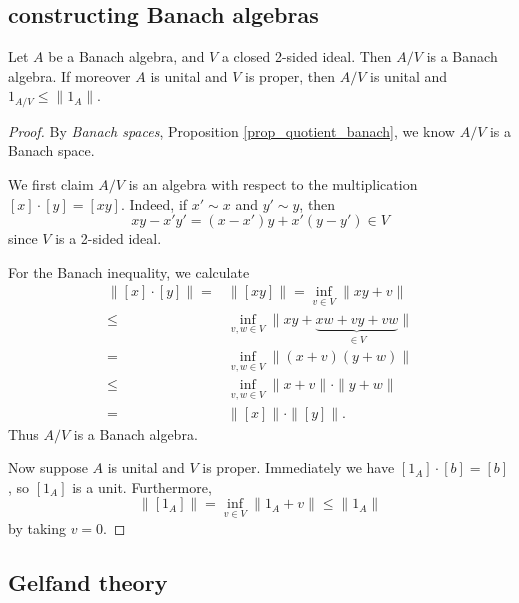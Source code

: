 \documentclass[12pt]{article}
\begin{document}

\subsection{constructing Banach algebras} %

\begin{proposition}
\label{prop_quotient_banach_alg}
	Let $A$ be a Banach algebra, and $V$ a closed 2-sided ideal. Then $A/V$ is a Banach algebra. If moreover $A$ is unital and $V$ is proper, then $A/V$ is unital and $1_{A/V} \leq \|1_A\|$.
\end{proposition}
\begin{proof}
	By \textit{Banach spaces}, Proposition \ref{prop_quotient_banach}, we know $A/V$ is a Banach space.  

	We first claim $A/V$ is an algebra with respect to the multiplication $[x]\cdot [y] = [xy]$. Indeed, if $x'\sim x$ and $y'\sim y$, then 
	\begin{equation*}
		xy - x'y' = (x - x')y + x'(y-y') \in V
	\end{equation*}
	since $V$ is a 2-sided ideal.
	
	For the Banach inequality, we calculate
	\begin{align*}
		\|[x]\cdot[y]\|
		=& \|[xy]\| = \inf_{v\in V}\|xy+v\| \\
		\leq& \inf_{v,w\in V}\|xy + \underbrace{xw + vy + vw}_{\in V}\| \\
		=& \inf_{v,w\in V} \|(x+v)(y+w)\| \\
		\leq& \inf_{v,w\in V} \|x+v\| \cdot \|y+w\| \\
		=& \|[x]\| \cdot \|[y]\|.
	\end{align*}
	Thus $A/V$ is a Banach algebra.

	Now suppose $A$ is unital and $V$ is proper. Immediately we have $[1_A]\cdot[b] = [b]$, so $[1_A]$ is a unit. Furthermore, 
	\begin{equation*}
		\|[1_A]\| = \inf_{v\in V}\|1_A + v\| \leq \|1_A\|
	\end{equation*}
	by taking $v=0$. 
\end{proof}


\subsection{Gelfand theory} %
\end{document}
